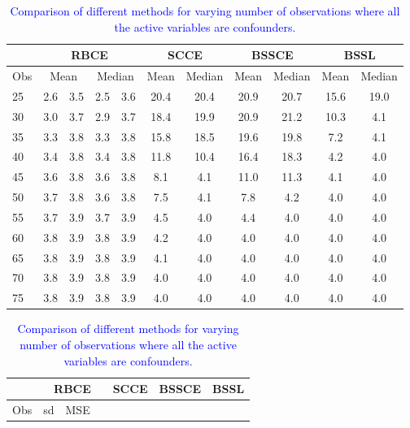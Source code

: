 \documentclass[preprint,12pt]{elsarticle}
\newcommand{\added}[1]{\textcolor{blue}{#1}}
\begin{document}
\begin{table}[ht]
	\tiny
	\centering
	\caption{\added{Comparison of different methods for varying number of observations where all the active variables are confounders.}}
	\label{tab:causal1a}
	\begin{tabular}{l|cccc|cc|cc|cc}
		\hline
		\multicolumn{1}{l|}{}&
		\multicolumn{4}{c|}{RBCE}&
		\multicolumn{2}{c|}{SCCE}&
		\multicolumn{2}{c|}{BSSCE}&
		\multicolumn{2}{c}{BSSL}\\
		\hline
		\multicolumn{1}{l|}{Obs}&
		\multicolumn{2}{c}{Mean}&
		\multicolumn{2}{c|}{Median}&
		\multicolumn{1}{c}{Mean}&
		\multicolumn{1}{c|}{Median}&
		\multicolumn{1}{c}{Mean}&
		\multicolumn{1}{c|}{Median}&
		\multicolumn{1}{c}{Mean}&
		\multicolumn{1}{c}{Median}\\
		\hline
		25 & 2.6 & 3.5 & 2.5 & 3.6 & 20.4 & 20.4 & 20.9 & 20.7 & 15.6 & 19.0 \\ 
		30 & 3.0 & 3.7 & 2.9 & 3.7 & 18.4 & 19.9 & 20.9 & 21.2 & 10.3 & 4.1 \\ 
		35 & 3.3 & 3.8 & 3.3 & 3.8 & 15.8 & 18.5 & 19.6 & 19.8 & 7.2 & 4.1 \\ 
		40 & 3.4 & 3.8 & 3.4 & 3.8 & 11.8 & 10.4 & 16.4 & 18.3 & 4.2 & 4.0 \\ 
		45 & 3.6 & 3.8 & 3.6 & 3.8 & 8.1 & 4.1 & 11.0 & 11.3 & 4.1 & 4.0 \\ 
		50 & 3.7 & 3.8 & 3.6 & 3.8 & 7.5 & 4.1 & 7.8 & 4.2 & 4.0 & 4.0 \\ 
		55 & 3.7 & 3.9 & 3.7 & 3.9 & 4.5 & 4.0 & 4.4 & 4.0 & 4.0 & 4.0 \\ 
		60 & 3.8 & 3.9 & 3.8 & 3.9 & 4.2 & 4.0 & 4.0 & 4.0 & 4.0 & 4.0 \\ 
		65 & 3.8 & 3.9 & 3.8 & 3.9 & 4.1 & 4.0 & 4.0 & 4.0 & 4.0 & 4.0 \\ 
		70 & 3.8 & 3.9 & 3.8 & 3.9 & 4.0 & 4.0 & 4.0 & 4.0 & 4.0 & 4.0 \\ 
		75 & 3.8 & 3.9 & 3.8 & 3.9 & 4.0 & 4.0 & 4.0 & 4.0 & 4.0 & 4.0 \\ 
		\hline
	\end{tabular}
	\begin{tabular}{l|rrrrr|rrr|rrr|rrr}
		\hline
		\multicolumn{1}{l|}{}&
		\multicolumn{5}{c|}{RBCE}&
		\multicolumn{3}{c|}{SCCE}&
		\multicolumn{3}{c|}{BSSCE}&
		\multicolumn{3}{c}{BSSL}\\
		\hline
		\multicolumn{1}{l|}{Obs}&
		\multicolumn{2}{c}{sd}&
		\multicolumn{2}{c}{MSE}&

\end{tabular}
\end{table}
\end{document}
